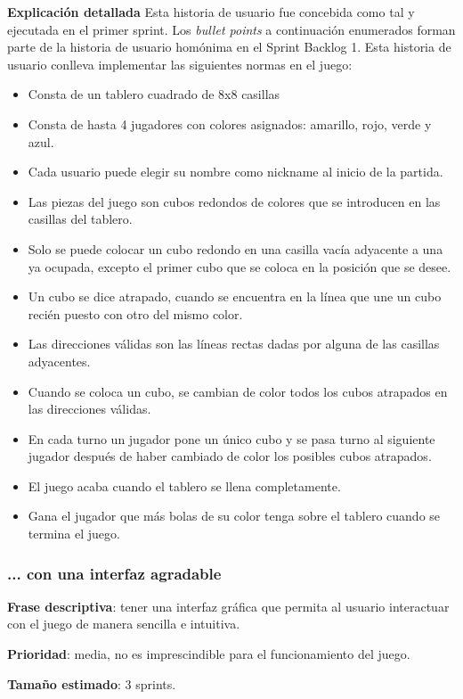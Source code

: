 \documentclass[../../FINAL/Scrum/SCRUM.tex]{subfiles}
\begin{document}
\textbf{Explicación detallada}
Esta historia de usuario fue concebida como tal y ejecutada en el primer sprint. Los \textit{bullet points} a continuación enumerados forman parte de la historia de usuario homónima en el Sprint Backlog 1.
Esta historia de usuario conlleva implementar las siguientes normas en el juego:
\begin{itemize}
\item Consta de un tablero cuadrado de 8x8 casillas
\item Consta de hasta 4 jugadores con colores asignados: amarillo, rojo, verde y azul.
\item Cada usuario puede elegir su nombre como nickname al inicio de la partida.
\item Las piezas del juego son cubos redondos de colores que se introducen en las casillas del tablero.
\item Solo se puede colocar un cubo redondo en una casilla vacía adyacente a una ya ocupada, excepto el primer cubo que se coloca en la posición que se desee.
\item Un cubo se dice atrapado, cuando se encuentra en la línea que une un cubo recién puesto con otro del mismo color.
\item Las direcciones válidas son las líneas rectas dadas por alguna de las casillas adyacentes.
\item Cuando se coloca un cubo, se cambian de color todos los cubos atrapados en las direcciones válidas.
\item En cada turno un jugador pone un único cubo y se pasa turno al siguiente jugador después de haber cambiado de color los posibles cubos atrapados.
\item El juego acaba cuando el tablero se llena completamente.
\item Gana el jugador que más bolas de su color tenga sobre el tablero cuando se termina el juego.
\end{itemize}

\subsubsection{... con una interfaz agradable}
\textbf{Frase descriptiva}: tener una interfaz gráfica que permita al usuario interactuar con el juego de manera sencilla e intuitiva.

\textbf{Prioridad}: media, no es imprescindible para el funcionamiento del juego.

\textbf{Tamaño estimado}: 3 sprints.
\end{document}
